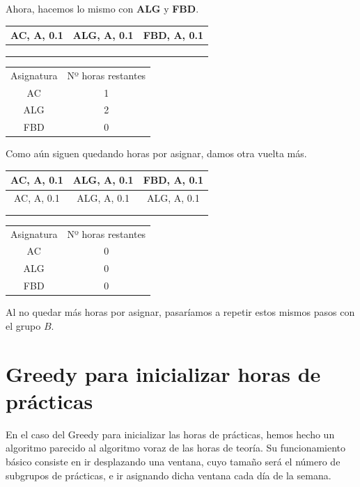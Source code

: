 Ahora, hacemos lo mismo con \textbf{ALG} y \textbf{FBD}.

\begin{minipage}{0.5\textwidth}    
\begin{tabular}{| c | c | c |}
\hline
AC, A, 0.1 & ALG, A, 0.1  & FBD, A, 0.1 \\
 \hline
 &  &  \\
 \hline
 &  &  \\
 \hline
 &  &  \\
 \hline 
\end{tabular}
\end{minipage}
\begin{minipage}{0.5\textwidth}
\begin{tabular}{c | c}
Asignatura & Nº horas restantes \\
AC & 1 \\
ALG & 2 \\
FBD & 0
\end{tabular}
\end{minipage}

Como aún siguen quedando horas por asignar, damos otra vuelta más.

\begin{minipage}{0.5\textwidth}    
\begin{tabular}{| c | c | c |}
\hline
AC, A, 0.1 & ALG, A, 0.1  & FBD, A, 0.1 \\
 \hline
AC, A, 0.1 & ALG, A, 0.1 & ALG, A, 0.1  \\
 \hline
 &  &  \\
 \hline
 &  &  \\
 \hline 
\end{tabular}
\end{minipage}
\begin{minipage}{0.5\textwidth}
\begin{tabular}{c | c}
Asignatura & Nº horas restantes \\
AC & 0 \\
ALG & 0 \\
FBD & 0
\end{tabular}
\end{minipage}

Al no quedar más horas por asignar, pasaríamos a repetir estos mismos pasos con el grupo $B$.

\section{Greedy para inicializar horas de prácticas}
En el caso del Greedy para inicializar las horas de prácticas, hemos hecho un algoritmo parecido al algoritmo voraz de las horas de teoría. Su funcionamiento básico consiste en ir desplazando una ventana, cuyo tamaño será el número de subgrupos de prácticas, e ir asignando dicha ventana cada día de la semana.

